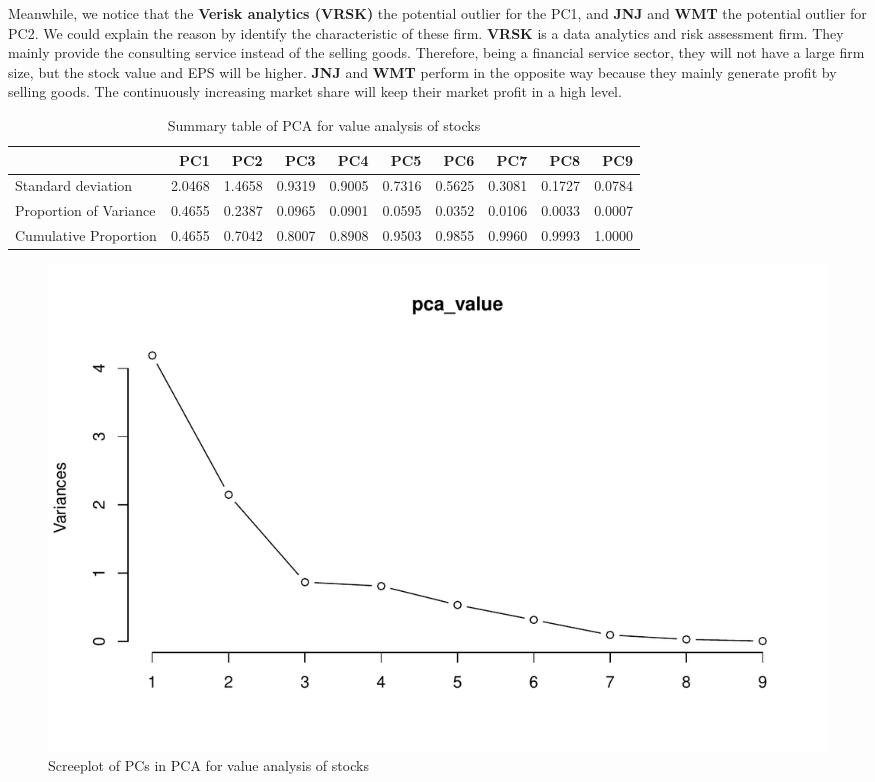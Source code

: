 \documentclass[11pt,a4paper,]{article}
\begin{document}
Meanwhile, we notice that the \textbf{Verisk analytics (VRSK)} the potential outlier for the PC1, and \textbf{JNJ} and \textbf{WMT} the potential outlier for PC2. We could explain the reason by identify the characteristic of these firm. \textbf{VRSK} is a data analytics and risk assessment firm. They mainly provide the consulting service instead of the selling goods. Therefore, being a financial service sector, they will not have a large firm size, but the stock value and EPS will be higher. \textbf{JNJ} and \textbf{WMT} perform in the opposite way because they mainly generate profit by selling goods. The continuously increasing market share will keep their market profit in a high level.

\begin{table}

\caption{\label{tab:lim-1}Summary table of PCA for value analysis of stocks}
\centering
\begin{tabular}[t]{l|r|r|r|r|r|r|r|r|r}
\hline
  & PC1 & PC2 & PC3 & PC4 & PC5 & PC6 & PC7 & PC8 & PC9\\
\hline
Standard deviation & 2.0468 & 1.4658 & 0.9319 & 0.9005 & 0.7316 & 0.5625 & 0.3081 & 0.1727 & 0.0784\\
\hline
Proportion of Variance & 0.4655 & 0.2387 & 0.0965 & 0.0901 & 0.0595 & 0.0352 & 0.0106 & 0.0033 & 0.0007\\
\hline
Cumulative Proportion & 0.4655 & 0.7042 & 0.8007 & 0.8908 & 0.9503 & 0.9855 & 0.9960 & 0.9993 & 1.0000\\
\hline
\end{tabular}
\end{table}

\begin{figure}
\centering
\includegraphics{ass2_files/figure-latex/lim-2-1.pdf}
\caption{\label{fig:lim-2}Screeplot of PCs in PCA for value analysis of stocks}
\end{figure}
\end{document}

